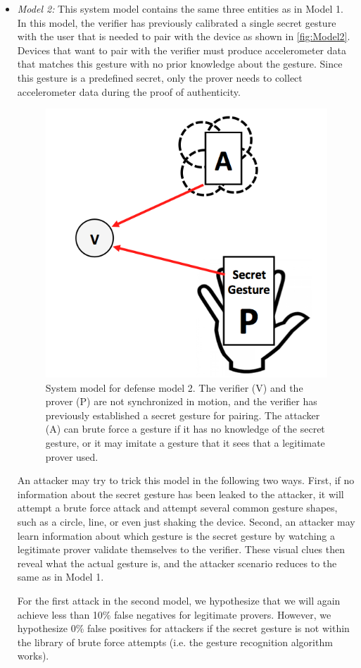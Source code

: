 \begin{itemize}
\item \emph{Model 2:} This system model contains the same three entities as in Model 1. In this model, the verifier has previously calibrated a single secret gesture with the user that is needed to pair with the device as shown in \autoref{fig:Model2}. Devices that want to pair with the verifier must produce accelerometer data that matches this gesture with no prior knowledge about the gesture. Since this gesture is a predefined secret, only the prover needs to collect accelerometer data during the proof of authenticity.

\begin{figure}[!tb]
\centering
\includegraphics[width=0.6 \linewidth]{./figures/model2.png}
\caption{System model for defense model 2. The verifier (V) and the prover (P) are not synchronized in motion, and the verifier has previously established a secret gesture for pairing. The attacker (A) can brute force a gesture if it has no knowledge of the secret gesture, or it may imitate a gesture that it sees that a legitimate prover used.}
\label{fig:Model2}
\end{figure}

An attacker may try to trick this model in the following two ways. First, if no information about the secret gesture has been leaked to the attacker, it will attempt a brute force attack and attempt several common gesture shapes, such as a circle, line, or even just shaking the device. Second, an attacker may learn information about which gesture is the secret gesture by watching a legitimate prover validate themselves to the verifier. These visual clues then reveal what the actual gesture is, and the attacker scenario reduces to the same as in Model 1. 

For the first attack in the second model, we hypothesize that we will again achieve less than 10\% false negatives for legitimate provers. However, we hypothesize 0\% false positives for attackers if the secret gesture is not within the library of brute force attempts (i.e. the gesture recognition algorithm works). 


\end{itemize}
